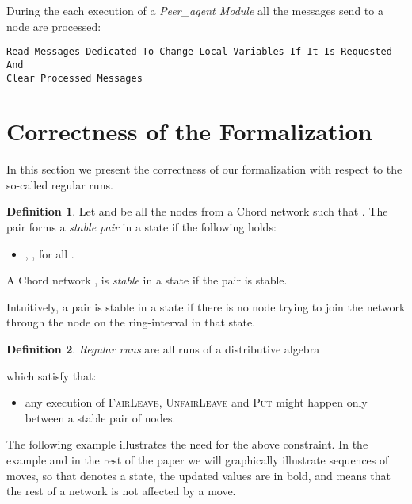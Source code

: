 \documentclass{amsart}
\theoremstyle{definition}
\newtheorem{definition}{Definition}[section]
\begin{document}
During the each execution of a {\em Peer\_agent Module} all the messages send to a node are processed:
\begin{lstlisting}[escapechar=\%]
Read Messages Dedicated To Change Local Variables If It Is Requested And
Clear Processed Messages
\end{lstlisting}

\section{Correctness of the Formalization}
\label{dokazi}


In this section we present the correctness of our formalization with respect to the so-called regular runs.

\begin{definition}
Let  and  be all the
nodes from a Chord network such that . The pair  forms a {\em stable
pair} in a state if the following holds:
\begin{itemize}
\item , , for all .
\end{itemize}
A Chord network ,  is
{\em stable} in a state if the pair  is
stable. \hfill 
\end{definition}
Intuitively, a pair  is stable in a
state if there is no node trying to join the network through the
node on the ring-interval  in that state.

\begin{definition}
{\em Regular runs} are all runs of a distributive algebra

which satisfy that:
\begin{itemize}


    \item any execution of \textsc{FairLeave}, \textsc{UnfairLeave} and \textsc{Put} might happen only between a stable pair of nodes.
    \label{ogranicenje1}\hfill 

\end{itemize}
\end{definition}

The following example illustrates the need for the above constraint. In the example and in the rest of the paper we will graphically
illustrate sequences of moves, so that  denotes a state, the updated values are in bold, and  means that the rest
of a network is not affected by a move.
\end{document}
